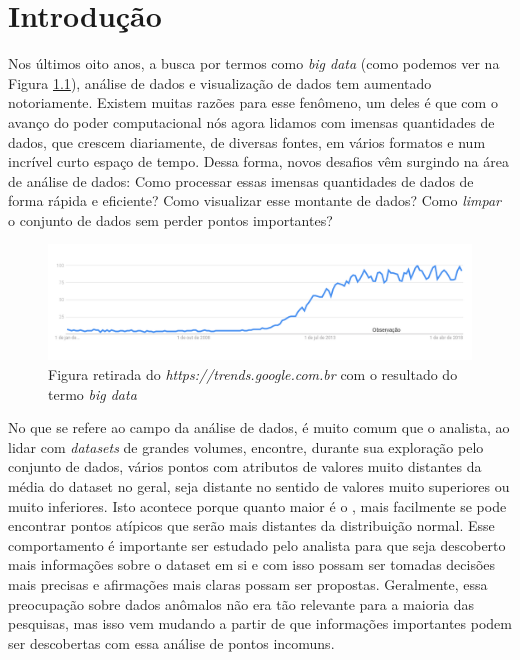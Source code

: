\chapter{Introdução}

Nos últimos oito anos, a busca por termos como \textit{big data} (como podemos ver na Figura \ref{fig:google-trend}), análise de dados e visualização de dados tem aumentado notoriamente. Existem muitas razões para esse fenômeno, um deles é que com o avanço do poder computacional nós agora lidamos com imensas quantidades de dados, que crescem diariamente, de diversas fontes, em vários formatos e num incrível curto espaço de tempo. Dessa forma, novos desafios vêm surgindo na área de análise de dados: Como processar essas imensas quantidades de dados de forma rápida e eficiente? Como visualizar esse montante de dados? Como \textit{limpar} o conjunto de dados sem perder pontos importantes?

\begin{figure}[!h]
	\centering
	\includegraphics[width=\textwidth]{images/google-trend-big-data.png}
	\caption{Figura retirada do \textit{https://trends.google.com.br} com o resultado do termo \textit{big data}}
	\label{fig:google-trend}
	\vspace{-10pt}
\end{figure}

No que se refere ao campo da análise de dados, é muito comum que o analista, ao lidar com \textit{datasets} de grandes volumes, encontre, durante sua exploração pelo conjunto de dados, vários pontos com atributos de valores muito distantes da média do dataset no geral, seja distante no sentido de valores muito superiores ou muito inferiores. Isto acontece porque quanto maior é o , mais facilmente se pode encontrar pontos atípicos que serão mais distantes da distribuição normal. Esse comportamento é importante ser estudado pelo analista para que seja descoberto mais informações sobre o dataset em si e com isso possam ser tomadas decisões mais precisas e afirmações mais claras possam ser propostas. Geralmente, essa preocupação sobre dados anômalos não era tão relevante para a maioria das pesquisas, mas isso vem mudando a partir de que informações importantes podem ser descobertas com essa análise de pontos incomuns.

